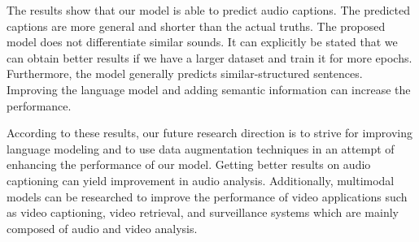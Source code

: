 \documentclass{article}
\begin{document}
The results show that our model is able to predict audio captions. The predicted captions are more general and shorter than the actual truths. The proposed model does not differentiate similar sounds. It can explicitly be stated that we can obtain better results if we have a larger dataset and train it for more epochs. Furthermore, the model generally predicts similar-structured sentences. Improving the language model and adding semantic information can increase the performance.

According to these results, our future research direction is to strive for improving language modeling and to use data augmentation techniques in an attempt of enhancing the performance of our model. Getting better results on audio captioning can yield improvement in audio analysis. Additionally, multimodal models can be researched to improve the performance of video applications such as video captioning, video retrieval, and surveillance systems which are mainly composed of audio and video analysis.



\end{document}
